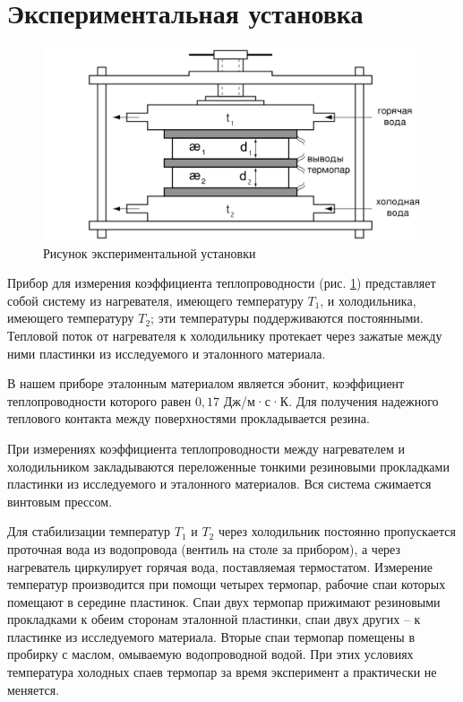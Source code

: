 \documentclass[a4paper,12pt]{article} %
\begin{document}
\section{Экспериментальная установка}

\begin{figure}[H]
	\begin{center}
		\includegraphics[width=15cm]{ust.jpg}
		\caption{Рисунок экспериментальной установки}\label{img:ust}
	\end{center}
\end{figure}

Прибор для измерения коэффициента теплопроводности (рис. \ref{img:ust}) представляет собой систему из нагревателя, имеющего температуру $ T_1 $, и холодильника, имеющего температуру $ T_2 $; эти температуры поддерживаются постоянными. Тепловой поток от нагревателя к холодильнику протекает через зажатые между ними пластинки из исследуемого и эталонного материала. 

В нашем приборе эталонным материалом является эбонит, коэффициент теплопроводности которого равен $ 0,17 $ Дж/м·с·К. Для получения надежного теплового контакта между поверхностями прокладывается резина. 

При измерениях коэффициента теплопроводности между нагревателем и холодильником закладываются переложенные тонкими резиновыми прокладками пластинки из исследуемого и эталонного материалов. Вся система сжимается винтовым прессом. 

Для стабилизации температур $ T_1 $ и $ T_2 $ через холодильник постоянно пропускается проточная вода из водопровода (вентиль на столе за прибором), а через нагреватель циркулирует горячая вода, поставляемая термостатом. Измерение температур производится при помощи четырех термопар, рабочие спаи которых помещают в середине пластинок. Спаи двух термопар прижимают резиновыми прокладками к обеим сторонам эталонной пластинки, спаи двух других -- к пластинке из исследуемого материала. Вторые спаи термопар помещены в пробирку с маслом, омываемую водопроводной водой. При этих условиях температура холодных спаев термопар за время эксперимент а практически не меняется.
\end{document}
